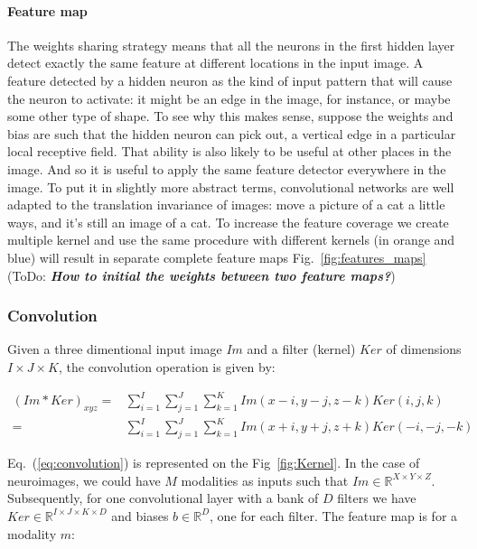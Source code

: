 \documentclass[final, paper=letter,5p,times,twocolumn]{elsarticle}
\newcommand{\ToDo}[1]{ToDo: \textbf{\textit{#1}}}
\begin{document}
\paragraph{Feature map}{The weights sharing strategy means that all the neurons in the first hidden layer detect exactly the same feature at different locations in the input image. A feature detected by a hidden neuron as the kind of input pattern that will cause the neuron to activate: it might be an edge in the image, for instance, or maybe some other type of shape. To see why this makes sense, suppose the weights and bias are such that the hidden neuron can pick out, a vertical edge in a particular local receptive field. That ability is also likely to be useful at other places in the image. And so it is useful to apply the same feature detector everywhere in the image. To put it in slightly more abstract terms, convolutional networks are well adapted to the translation invariance of images: move a picture of a cat a little ways, and it's still an image of a cat. To increase the feature coverage we create multiple kernel and use the same procedure with different kernels (in orange and blue) will result in separate complete feature maps Fig.~\ref{fig:features_maps} (\ToDo{How to initial the weights between two feature maps?})}

\subsubsection{Convolution}

Given a three dimentional input image $Im$ and a filter (kernel) $Ker$ of dimensions $I \times J \times K$, the convolution operation is given by:

\begin{equation}
  \begin{split}
    (Im*Ker)_{xyz} = & \sum_{i=1}^{I}\sum_{j=1}^{J}\sum_{k=1}^{K}Im(x-i,y-j,z-k)Ker(i,j,k)\\
    = & \sum_{i=1}^{I}\sum_{j=1}^{J}\sum_{k=1}^{K}Im(x+i,y+j,z+k)Ker(-i,-j,-k)
  \end{split}
  \label{eq:convolution} 
\end{equation}

Eq.~(\ref{eq:convolution}) is represented on the Fig~\ref{fig:Kernel}. In the case of neuroimages, we could have $M$ modalities as inputs such that $Im \in \mathbb{R}^{X \times Y \times Z}$. Subsequently, for one convolutional layer with a bank of $D$ filters we have $Ker \in \mathbb{R}^{I \times J \times K \times D}$ and biases $b \in \mathbb{R}^{D}$, one for each filter. The feature map is for a modality $m$:
\end{document}
